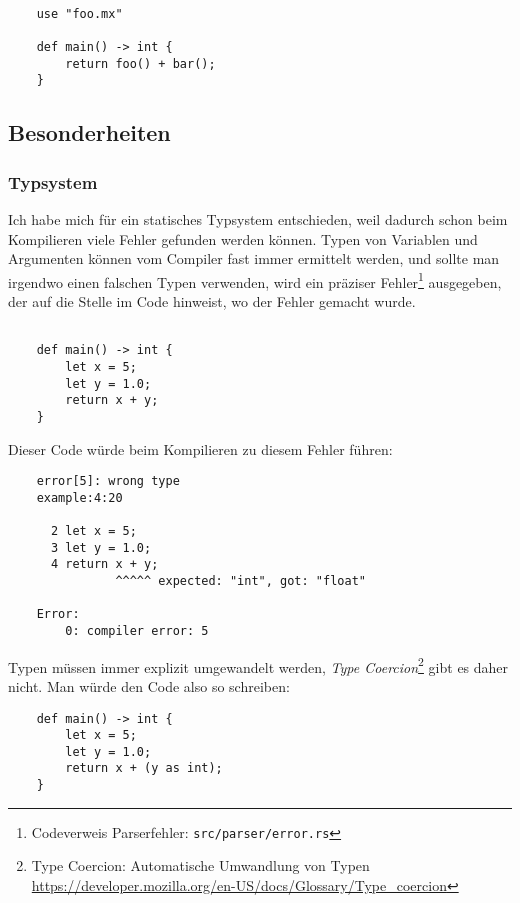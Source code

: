         \begin{lstlisting}

    use "foo.mx"

    def main() -> int {
        return foo() + bar();
    }

        \end{lstlisting}
            
    \subsection{Besonderheiten}

        \subsubsection{Typsystem}

        Ich habe mich für ein statisches Typsystem entschieden, weil dadurch schon beim Kompilieren
        viele Fehler gefunden werden können. Typen von Variablen und Argumenten können vom Compiler 
        fast immer ermittelt werden, und sollte man irgendwo einen falschen Typen verwenden, wird ein präziser
        Fehler\footnote{Codeverweis Parserfehler: \texttt{src/parser/error.rs}} ausgegeben, der auf die Stelle im Code hinweist, wo der Fehler gemacht wurde.

        \begin{lstlisting}
            
    def main() -> int {
        let x = 5;
        let y = 1.0;
        return x + y;
    }

        \end{lstlisting}
        

        Dieser Code würde beim Kompilieren zu diesem Fehler führen:
    
        \begin{lstlisting}
    error[5]: wrong type
    example:4:20
        
      2 let x = 5;
      3 let y = 1.0;
      4 return x + y;
               ^^^^^ expected: "int", got: "float"

    Error:
        0: compiler error: 5
            \end{lstlisting}

        Typen müssen immer explizit umgewandelt werden, 
        \emph{Type Coercion}\footnote{Type Coercion: Automatische Umwandlung von Typen 
        \url{https://developer.mozilla.org/en-US/docs/Glossary/Type_coercion}} 
        gibt es daher nicht. Man würde den Code also so schreiben:
        \begin{lstlisting}
    def main() -> int {
        let x = 5;
        let y = 1.0;
        return x + (y as int);
    }
        \end{lstlisting}

